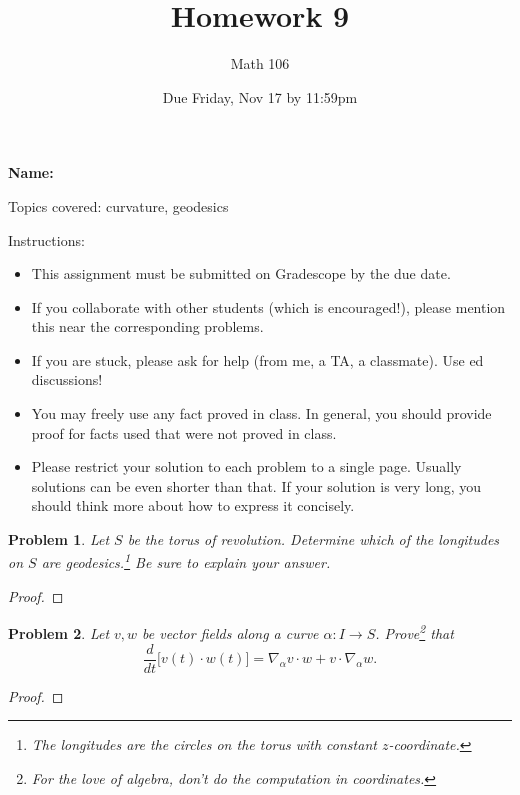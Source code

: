\documentclass[11pt]{article}
\author{Math 106}
\date{Due Friday, Nov 17 by 11:59pm}
\title{Homework 9}
\newtheorem{problem}{Problem}
\begin{document}
\maketitle

{\bf\Large Name:} 


\vspace{.3in}
Topics covered: curvature, geodesics

Instructions: 
\begin{itemize}
\item This assignment must be submitted on Gradescope by the due date. 
\item If you collaborate with other students (which is encouraged!), please mention this near the corresponding problems. 
\item If you are stuck, please ask for help (from me, a TA, a classmate). Use ed discussions!  
\item You may freely use any fact proved in class. In general, you should provide proof for facts used that were not proved in class. 
\item Please restrict your solution to each problem to a single page. Usually solutions can be even shorter than that. If your solution is very long, you should think more about how to express it concisely.
\end{itemize}
\pagebreak 

\begin{problem}
Let $S$ be the torus of revolution. Determine which of the longitudes on $S$ are geodesics.\footnote{The longitudes are the circles on the torus with constant $z$-coordinate. } Be sure to explain your answer. 
\end{problem}

\begin{proof}

\end{proof}




\begin{problem}
Let $v,w$ be vector fields along a curve $\alpha:I\to S$. Prove\footnote{For the love of algebra, don't do the computation in coordinates.} that 
\[\frac{d}{dt}\big[v(t)\cdot w(t)\big]=\nabla_\alpha v\cdot w+v\cdot\nabla_\alpha w.\]
\end{problem}

\begin{proof}

\end{proof}
\end{document}
